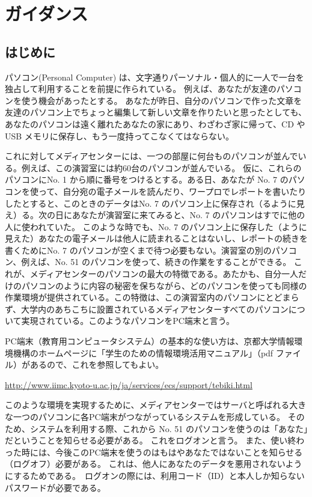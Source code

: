 \chapter{ガイダンス}

\section{はじめに}
パソコン(Personal Computer) は、文字通りパーソナル・個人的に一人で一台を独占して利用することを前提に作られている。
例えば、あなたが友達のパソコンを使う機会があったとする。
あなたが昨日、自分のパソコンで作った文章を友達のパソコン上でちょっと編集して新しい文章を作りたいと思ったとしても、
あなたのパソコンは遠く離れたあなたの家にあり、わざわざ家に帰って、CD や USB メモリに保存し、もう一度持ってこなくてはならない。

これに対してメディアセンターには、一つの部屋に何台ものパソコンが並んでいる。例えば、この演習室には約60台のパソコンが並んでいる。
仮に、これらのパソコンにNo. 1 から順に番号をつけるとする。ある日、あなたが No. 7 のパソコンを使って、自分宛の電子メールを読んだり、ワープロでレポートを書いたりしたとすると、このときのデータはNo. 7 のパソコン上に保存され（るように見え）る。次の日にあなたが演習室に来てみると、No. 7 のパソコンはすでに他の人に使われていた。
このような時でも、No. 7 のパソコン上に保存した（ように見えた）あなたの電子メールは他人に読まれることはないし、レポートの続きを書くためにNo. 7 のパソコンが空くまで待つ必要もない。演習室の別のパソコン、例えば、No. 51 のパソコンを使って、続きの作業をすることができる。
これが、メディアセンターのパソコンの最大の特徴である。あたかも、自分一人だけのパソコンのように内容の秘密を保ちながら、どのパソコンを使っても同様の作業環境が提供されている。この特徴は、この演習室内のパソコンにとどまらず、大学内のあちこちに設置されているメディアセンターすべてのパソコンについて実現されている。このようなパソコンをPC端末と言う。

PC端末（教育用コンピュータシステム）の基本的な使い方は、京都大学情報環境機構のホームページに「学生のための情報環境活用マニュアル」（pdf ファイル）があるので、これを参照してもよい。

\url{http://www.iimc.kyoto-u.ac.jp/ja/services/ecs/support/tebiki.html}

このような環境を実現するために、メディアセンターではサーバと呼ばれる大きな一つのパソコンに各PC端末がつながっているシステムを形成している。
そのため、システムを利用する際、これから No. 51 のパソコンを使うのは「あなた」だということを知らせる必要がある。
これをログオンと言う。
また、使い終わった時には、今後このPC端末を使うのはもはやあなたではないことを知らせる（ログオフ）必要がある。
これは、他人にあなたのデータを悪用されないようにするためである。　ログオンの際には、利用コード（ID）と本人しか知らないパスワードが必要である。

